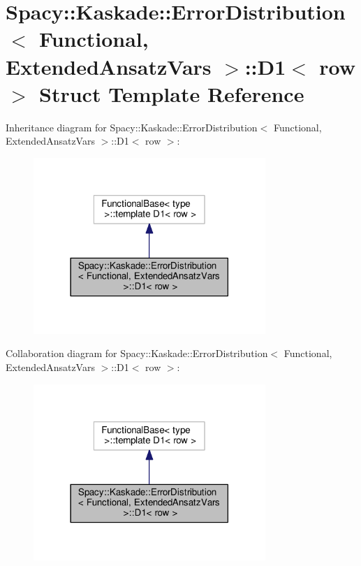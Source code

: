 \hypertarget{structSpacy_1_1Kaskade_1_1ErrorDistribution_1_1D1}{}\section{Spacy\+:\+:Kaskade\+:\+:Error\+Distribution$<$ Functional, Extended\+Ansatz\+Vars $>$\+:\+:D1$<$ row $>$ Struct Template Reference}
\label{structSpacy_1_1Kaskade_1_1ErrorDistribution_1_1D1}


Inheritance diagram for Spacy\+:\+:Kaskade\+:\+:Error\+Distribution$<$ Functional, Extended\+Ansatz\+Vars $>$\+:\+:D1$<$ row $>$\+:\nopagebreak
\begin{figure}[H]
\begin{center}
\leavevmode
\includegraphics[width=249pt]{structSpacy_1_1Kaskade_1_1ErrorDistribution_1_1D1__inherit__graph}
\end{center}
\end{figure}


Collaboration diagram for Spacy\+:\+:Kaskade\+:\+:Error\+Distribution$<$ Functional, Extended\+Ansatz\+Vars $>$\+:\+:D1$<$ row $>$\+:\nopagebreak
\begin{figure}[H]
\begin{center}
\leavevmode
\includegraphics[width=249pt]{structSpacy_1_1Kaskade_1_1ErrorDistribution_1_1D1__coll__graph}
\end{center}
\end{figure}
